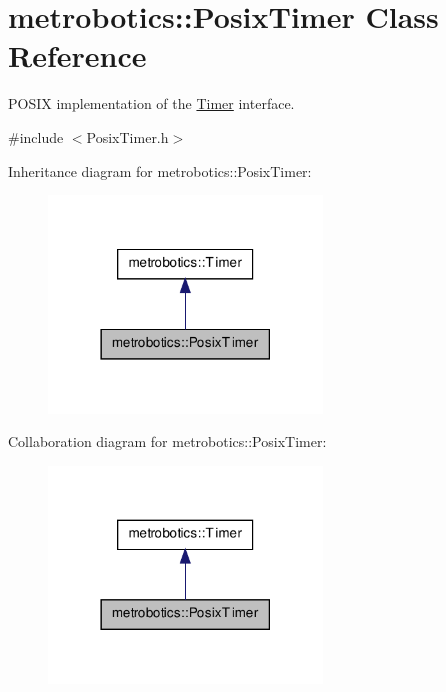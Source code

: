 \hypertarget{classmetrobotics_1_1PosixTimer}{\section{metrobotics\-:\-:\-Posix\-Timer \-Class \-Reference}
\label{classmetrobotics_1_1PosixTimer}
}


\-P\-O\-S\-I\-X implementation of the \hyperlink{classmetrobotics_1_1Timer}{\-Timer} interface.  




{\ttfamily \#include $<$\-Posix\-Timer.\-h$>$}



\-Inheritance diagram for metrobotics\-:\-:\-Posix\-Timer\-:
\nopagebreak
\begin{figure}[H]
\begin{center}
\leavevmode
\includegraphics[width=206pt]{classmetrobotics_1_1PosixTimer__inherit__graph}
\end{center}
\end{figure}


\-Collaboration diagram for metrobotics\-:\-:\-Posix\-Timer\-:
\nopagebreak
\begin{figure}[H]
\begin{center}
\leavevmode
\includegraphics[width=206pt]{classmetrobotics_1_1PosixTimer__coll__graph}
\end{center}
\end{figure}
